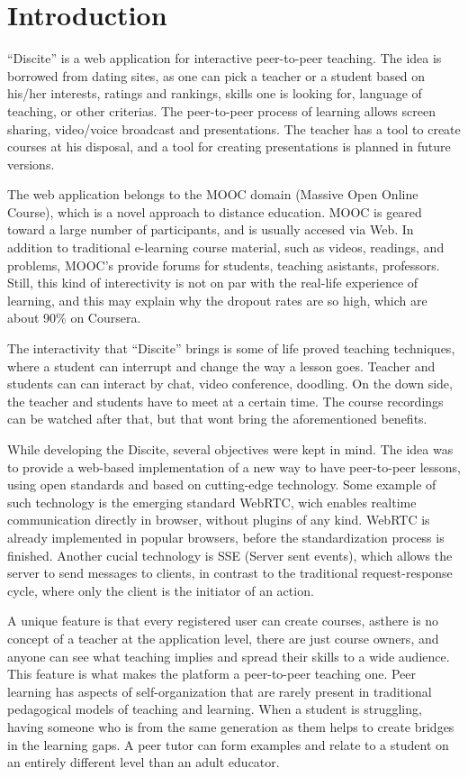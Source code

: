 \section*{Introduction}
``Discite'' is a web application for interactive peer-to-peer teaching.  The
idea is borrowed from dating sites, as one can pick a teacher or a student
based on his/her interests, ratings and rankings, skills one is looking for,
language of teaching, or other criterias. The peer-to-peer process of learning
allows screen sharing, video/voice broadcast and presentations. The teacher has
a tool to create courses at his disposal, and a tool for creating presentations
is planned in future versions.

The web application belongs to the MOOC domain (Massive Open Online Course),
which is a novel approach to distance education. MOOC is geared toward a large
number of participants, and is usually accesed via Web. In addition to
traditional e-learning course material, such as videos, readings, and problems,
MOOC's provide forums for students, teaching asistants, professors. Still, this
kind of interectivity is not on par with the real-life experience of learning,
and this may explain why the dropout rates are so high, which are about 90\% on
Coursera\citep{courseradropout}.

The interactivity that ``Discite'' brings is some of life proved teaching
techniques, where a student can interrupt and change the way a lesson goes.
Teacher and students can can interact by chat, video conference, doodling.  On
the down side, the teacher and students have to meet at a certain time. The
course recordings can be watched after that, but that wont bring the
aforementioned benefits.

While developing the Discite, several objectives were kept in mind. The idea was
to provide a web-based implementation of a new way to have peer-to-peer lessons,
using open standards and  based on cutting-edge technology. Some example of such
technology is the emerging standard WebRTC, wich enables realtime communication
directly in browser, without plugins of any kind. WebRTC is already implemented
in popular browsers, before the standardization process is finished. Another
cucial technology is SSE (Server sent events), which allows the server to send
messages to clients, in contrast to the traditional request-response cycle, where
only the client is the initiator of an action.

A unique feature is that every registered user can create courses, asthere is no
concept of a teacher at the application level, there are just course owners,
and anyone can see what teaching implies and spread their skills to a wide
audience. This feature is what makes the platform a peer-to-peer teaching one.
Peer learning has aspects of self-organization that are rarely present in
traditional pedagogical models of teaching and learning.  When a student is
struggling, having someone who is from the same generation as them helps to
create bridges in the learning gaps. A peer tutor can form examples and relate
to a student on an entirely different level than an adult educator.

